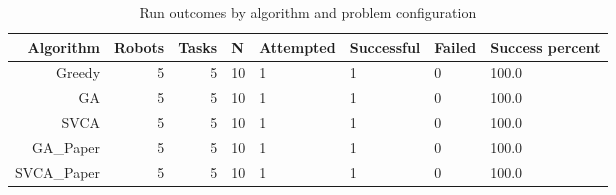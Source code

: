 \begin{table}[htbp]
\centering
\small
\caption{Run outcomes by algorithm and problem configuration}
\label{tab:research_smoke_c1_r1_20261122_reliability}
\begin{tabular}{rrrlllll}
\hline
Algorithm & Robots & Tasks & N & Attempted & Successful & Failed & Success percent \\
\hline
Greedy & 5 & 5 & 10 & 1 & 1 & 0 & 100.0 \\
GA & 5 & 5 & 10 & 1 & 1 & 0 & 100.0 \\
SVCA & 5 & 5 & 10 & 1 & 1 & 0 & 100.0 \\
GA\_Paper & 5 & 5 & 10 & 1 & 1 & 0 & 100.0 \\
SVCA\_Paper & 5 & 5 & 10 & 1 & 1 & 0 & 100.0 \\
\hline
\end{tabular}
\end{table}
